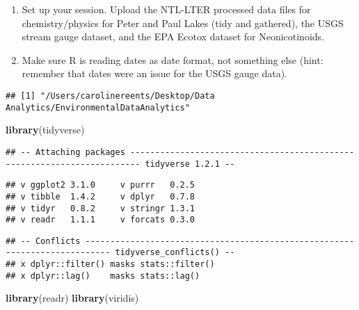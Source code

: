 \documentclass[]{article}
\newenvironment{Shaded}{\begin{snugshade}}{\end{snugshade}}
\newcommand{\KeywordTok}[1]{\textcolor[rgb]{0.13,0.29,0.53}{\textbf{#1}}}
\newcommand{\CommentTok}[1]{\textcolor[rgb]{0.56,0.35,0.01}{\textit{#1}}}
\newcommand{\NormalTok}[1]{#1}
\begin{document}
\begin{enumerate}
\def\labelenumi{\arabic{enumi}.}
\item
  Set up your session. Upload the NTL-LTER processed data files for
  chemistry/physics for Peter and Paul Lakes (tidy and gathered), the
  USGS stream gauge dataset, and the EPA Ecotox dataset for
  Neonicotinoids.
\item
  Make sure R is reading dates as date format, not something else (hint:
  remember that dates were an issue for the USGS gauge data).
\end{enumerate}

\begin{Shaded}
\end{Shaded}

\begin{verbatim}
## [1] "/Users/carolinereents/Desktop/Data Analytics/EnvironmentalDataAnalytics"
\end{verbatim}

\begin{Shaded}
\begin{Highlighting}[]
\KeywordTok{library}\NormalTok{(tidyverse)}
\end{Highlighting}
\end{Shaded}

\begin{verbatim}
## -- Attaching packages ------------------------------------------------------------------------ tidyverse 1.2.1 --
\end{verbatim}

\begin{verbatim}
## v ggplot2 3.1.0     v purrr   0.2.5
## v tibble  1.4.2     v dplyr   0.7.8
## v tidyr   0.8.2     v stringr 1.3.1
## v readr   1.1.1     v forcats 0.3.0
\end{verbatim}

\begin{verbatim}
## -- Conflicts --------------------------------------------------------------------------- tidyverse_conflicts() --
## x dplyr::filter() masks stats::filter()
## x dplyr::lag()    masks stats::lag()
\end{verbatim}

\begin{Shaded}
\begin{Highlighting}[]
\KeywordTok{library}\NormalTok{(readr)}
\KeywordTok{library}\NormalTok{(viridis)}
\end{Highlighting}
\end{Shaded}
\end{document}
